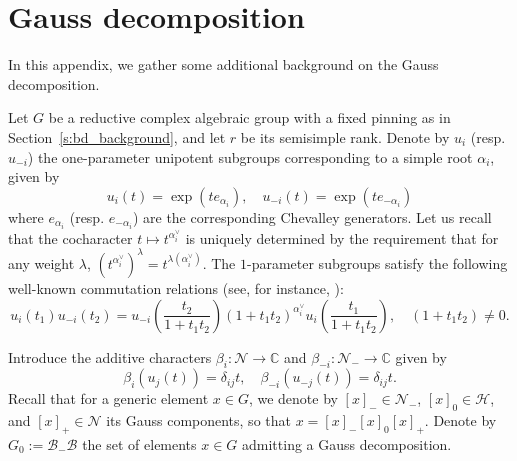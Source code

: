 \documentclass[11pt]{article}
\theoremstyle{definition}\newtheorem{definition}[theorem]{Definition}
\theoremstyle{definition}\newtheorem{remark}[theorem]{Remark}
\theoremstyle{remark}
\numberwithin{equation}{section}
\begin{document}
\appendix
\section{Gauss decomposition}\label{s:appendix_gauss}
In this appendix, we gather some additional background on the Gauss decomposition. 

Let $G$ be a reductive complex algebraic group with a fixed pinning as in Section~\ref{s:bd_background}, and let $r$ be its semisimple rank. Denote by $u_{i} $ (resp. $u_{-i}$) the one-parameter unipotent subgroups corresponding to a simple root $\alpha_i$, given by
\begin{equation*}
    u_{i}(t) = \exp(t e_{\alpha_i}), \quad u_{-i}(t) = \exp(te_{-\alpha_i})
\end{equation*}
where $e_{\alpha_i}$ (resp. $e_{-\alpha_i}$) are the corresponding Chevalley generators. Let us recall that the cocharacter $t \mapsto t^{\alpha_i^{\vee}}$ is uniquely determined by the requirement that for any weight $\lambda$, $(t^{\alpha_i^{\vee}})^{\lambda} = t^{\lambda(\alpha_i^{\vee})}$. The $1$-parameter subgroups satisfy the following well-known commutation relations (see, for instance, \cite[Section 2]{fz-dbl-bruhat}):
\begin{equation}\label{eq:comm_rel}
    u_i(t_1) u_{-i}(t_2) = u_{-i}\left( \frac{t_2}{1+t_1t_2}\right) (1+t_1 t_2)^{\alpha_i^\vee} u_i\left( \frac{t_1}{1+t_1 t_2}\right), \quad (1+t_1 t_2) \neq 0.
\end{equation}

Introduce the additive characters $\beta_i : \mathcal{N} \rightarrow \mathbb{C}$ and $\beta_{-i} : \mathcal{N}_- \rightarrow \mathbb{C}$ given by
\begin{equation*}
    \beta_i(u_j(t)) = \delta_{ij} t, \quad \beta_{-i}(u_{-j}(t)) = \delta_{ij} t.
\end{equation*}
Recall that for a generic element $x \in G$, we denote by $[x]_- \in \mathcal{N}_-$, $[x]_0 \in \mathcal{H}$, and $[x]_+ \in \mathcal{N}$ its Gauss components, so that $x = [x]_-[x]_0 [x]_+$. Denote by $G_0:=\mathcal{B}_-\mathcal{B}$ the set of elements $x \in G$ admitting a Gauss decomposition.
\end{document}
